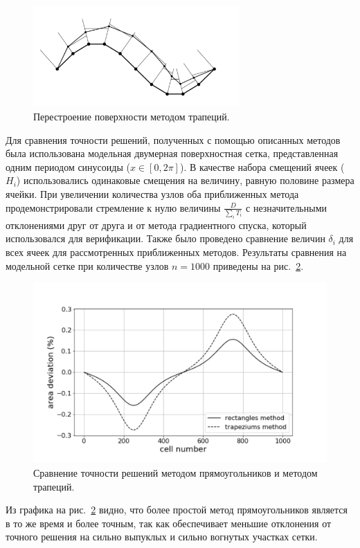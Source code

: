 \begin{figure}[h]
\onelinecaptionstrue
\centering
\includegraphics[width=0.7\textwidth]{pics/text_1_remesh_2d/grid_trapeziums.pdf}
\caption{Перестроение поверхности методом трапеций.}
\label{fig:text_1_remesh_2d_grid_trapeziums}
\end{figure}

Для сравнения точности решений, полученных с помощью описанных методов была использована модельная двумерная поверхностная сетка, представленная одним периодом синусоиды ($x \in [0, 2 \pi]$).
В качестве набора смещений ячеек ($H_i$) использовались одинаковые смещения на величину, равную половине размера ячейки.
При увеличении количества узлов оба приближенных метода продемонстрировали стремление к нулю величины $\frac{D}{\sum_i{T_i}}$ с незначительными отклонениями друг от друга и от метода градиентного спуска, который использовался для верификации.
Также было проведено сравнение величин $\delta_i$ для всех ячеек для рассмотренных приближенных методов.
Результаты сравнения на модельной сетке при количестве узлов $n = 1000$ приведены на рис.~\ref{fig:text_1_remesh_2d_graphic}.

\begin{figure}[h]
\onelinecaptionstrue
\centering
\includegraphics[width=1.0\textwidth]{pics/text_1_remesh_2d/graphic.pdf}
\caption{Сравнение точности решений методом прямоугольников и методом трапеций.}
\label{fig:text_1_remesh_2d_graphic}
\end{figure}

Из графика на рис.~\ref{fig:text_1_remesh_2d_graphic} видно, что более простой метод прямоугольников является в то же время и более точным, так как обеспечивает меньшие отклонения от точного решения на сильно выпуклых и сильно вогнутых участках сетки.
